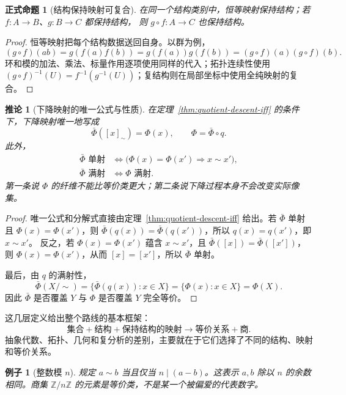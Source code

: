 \documentclass[UTF8,fontset=none,a4paper,11pt]{ctexart}
\theoremstyle{foundation-definition}
\theoremstyle{foundation-theorem}
\theoremstyle{foundation-proposition}
\newtheorem{proposition}[definition]{正式命题}
\theoremstyle{foundation-example}
\newtheorem{example}[definition]{例子}
\theoremstyle{foundation-remark}
\theoremstyle{foundation-theorem}
\newtheorem{corollary}[definition]{推论}
\newcommand{\Z}{\mathbb Z}
\begin{document}
\begin{proposition}[结构保持映射可复合]\label{prop:structure-preserving-composition}
在同一个结构类别中，恒等映射保持结构；若 \(f:A\to B\)、\(g:B\to C\) 都保持结构，
则 \(g\circ f:A\to C\) 也保持结构。
\end{proposition}

\begin{proof}
恒等映射把每个结构数据送回自身。以群为例，
\[
(g\circ f)(ab)=g(f(a)f(b))=g(f(a))g(f(b))
=(g\circ f)(a)(g\circ f)(b).
\]
环和模的加法、乘法、标量作用逐项使用同样的代入；拓扑连续性使用
\((g\circ f)^{-1}(U)=f^{-1}(g^{-1}(U))\)；复结构则在局部坐标中使用全纯映射的复合。
\end{proof}

\begin{corollary}[下降映射的唯一公式与性质]\label{prop:quotient-descent}
在定理~\ref{thm:quotient-descent-iff} 的条件下，下降映射唯一地写成
\[
\bar\Phi([x]_{\sim})=\Phi(x),\qquad \Phi=\bar\Phi\circ q.
\]
此外，
\[
\begin{aligned}
\bar\Phi\text{ 单射}
&\Longleftrightarrow
\bigl(\Phi(x)=\Phi(x')\Longrightarrow x\sim x'\bigr),\\
\bar\Phi\text{ 满射}
&\Longleftrightarrow
\Phi\text{ 满射}.
\end{aligned}
\]
第一条说 \(\Phi\) 的纤维不能比等价类更大；第二条说下降过程本身不会改变实际像集。
\end{corollary}

\begin{proof}
唯一公式和分解式直接由定理~\ref{thm:quotient-descent-iff} 给出。若
\(\bar\Phi\) 单射且 \(\Phi(x)=\Phi(x')\)，则
\(\bar\Phi(q(x))=\bar\Phi(q(x'))\)，所以 \(q(x)=q(x')\)，即 \(x\sim x'\)。
反之，若 \(\Phi(x)=\Phi(x')\) 蕴含 \(x\sim x'\)，且
\(\bar\Phi([x])=\bar\Phi([x'])\)，则 \(\Phi(x)=\Phi(x')\)，从而
\([x]=[x']\)，所以 \(\bar\Phi\) 单射。

最后，由 \(q\) 的满射性，
\[
\bar\Phi(X/{\sim})
=\{\bar\Phi(q(x)):x\in X\}
=\{\Phi(x):x\in X\}
=\Phi(X).
\]
因此 \(\bar\Phi\) 是否覆盖 \(Y\) 与 \(\Phi\) 是否覆盖 \(Y\) 完全等价。
\end{proof}

这几层定义给出整个路线的基本框架：
\[
\text{集合}+\text{结构}+\text{保持结构的映射}
\longrightarrow
\text{等价关系}+\text{商}.
\]
抽象代数、拓扑、几何和复分析的差别，主要就在于它们选择了不同的结构、映射和等价关系。

\begin{example}[整数模 \(n\)]
规定 \(a\sim b\) 当且仅当 \(n\mid(a-b)\)。这表示 \(a,b\) 除以 \(n\) 的余数相同。商集 \(\Z/n\Z\) 的元素是等价类，不是某一个被偏爱的代表数字。
\end{example}
\end{document}
